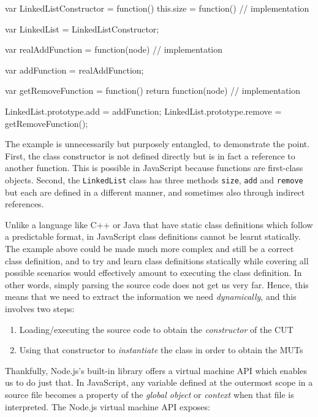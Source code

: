 \begin{code}[caption=Runtime dependent class definition,label=runtimeclassdef]

var LinkedListConstructor = function() {
    this.size = function() {
        // implementation
    }
}

var LinkedList = LinkedListConstructor;

var realAddFunction = function(node) {
    // implementation
}

var addFunction = realAddFunction;

var getRemoveFunction = function() {
    return function(node) {
        // implementation
    }
}

LinkedList.prototype.add = addFunction;
LinkedList.prototype.remove = getRemoveFunction();
\end{code}

The example is unnecessarily but purposely entangled, to demonstrate the point. First, the class constructor is not defined directly but is in fact a reference to another function. This is possible in JavaScript because functions are first-class objects. Second, the \texttt{LinkedList} class has three methods \texttt{size}, \texttt{add} and \texttt{remove} but each are defined in a different manner, and sometimes also through indirect references.

Unlike a language like C++ or Java that have static class definitions which follow a predictable format, in JavaScript class definitions cannot be learnt statically. The example above could be made much more complex and still be a correct class definition, and to try and learn class definitions statically while covering all possible scenarios would effectively amount to executing the class definition. In other words, simply parsing the source code does not get us very far. Hence, this means that we need to extract the information we need \emph{dynamically}, and this involves two steps:

\begin{enumerate}
   \item Loading/executing the source code to obtain the \emph{constructor} of the CUT
   \item Using that constructor to \emph{instantiate} the class in order to obtain the MUTs
\end{enumerate}

Thankfully, Node.js's built-in library offers a virtual machine API which enables us to do just that. In JavaScript, any variable defined at the outermost scope in a source file becomes a property of the \emph{global object} or \emph{context} when that file is interpreted. The Node.js virtual machine API exposes:\\

